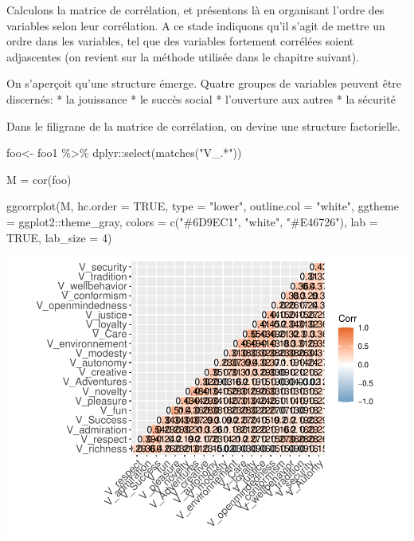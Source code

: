 \documentclass[
]{book}
\newenvironment{Shaded}{\begin{snugshade}}{\end{snugshade}}
\newcommand{\AttributeTok}[1]{\textcolor[rgb]{0.77,0.63,0.00}{#1}}
\newcommand{\ConstantTok}[1]{\textcolor[rgb]{0.00,0.00,0.00}{#1}}
\newcommand{\DecValTok}[1]{\textcolor[rgb]{0.00,0.00,0.81}{#1}}
\newcommand{\FunctionTok}[1]{\textcolor[rgb]{0.00,0.00,0.00}{#1}}
\newcommand{\NormalTok}[1]{#1}
\newcommand{\OtherTok}[1]{\textcolor[rgb]{0.56,0.35,0.01}{#1}}
\newcommand{\SpecialCharTok}[1]{\textcolor[rgb]{0.00,0.00,0.00}{#1}}
\newcommand{\StringTok}[1]{\textcolor[rgb]{0.31,0.60,0.02}{#1}}
\begin{document}
Calculons la matrice de corrélation, et présentons là en organisant l'ordre des variables selon leur corrélation. A ce stade indiquons qu'il s'agit de mettre un ordre dans les variables, tel que des variables fortement corrélées soient adjascentes (on revient sur la méthode utilisée dans le chapitre suivant).

On s'aperçoit qu'une structure émerge. Quatre groupes de variables peuvent être discernés:
* la jouissance
* le succès social
* l'ouverture aux autres
* la sécurité

Dans le filigrane de la matrice de corrélation, on devine une structure factorielle.

\begin{Shaded}
\begin{Highlighting}[]
\NormalTok{foo}\OtherTok{\textless{}{-}}\NormalTok{ foo1 }\SpecialCharTok{\%\textgreater{}\%} 
\NormalTok{  dplyr}\SpecialCharTok{::}\FunctionTok{select}\NormalTok{(}\FunctionTok{matches}\NormalTok{(}\StringTok{"V\_.*"}\NormalTok{))}

\NormalTok{M }\OtherTok{=} \FunctionTok{cor}\NormalTok{(foo)}

\FunctionTok{ggcorrplot}\NormalTok{(M, }\AttributeTok{hc.order =} \ConstantTok{TRUE}\NormalTok{, }\AttributeTok{type =} \StringTok{"lower"}\NormalTok{,}
   \AttributeTok{outline.col =} \StringTok{"white"}\NormalTok{,}
   \AttributeTok{ggtheme =}\NormalTok{ ggplot2}\SpecialCharTok{::}\NormalTok{theme\_gray,}
   \AttributeTok{colors =} \FunctionTok{c}\NormalTok{(}\StringTok{"\#6D9EC1"}\NormalTok{, }\StringTok{"white"}\NormalTok{, }\StringTok{"\#E46726"}\NormalTok{), }\AttributeTok{lab =} \ConstantTok{TRUE}\NormalTok{, }\AttributeTok{lab\_size =} \DecValTok{4}\NormalTok{)}
\end{Highlighting}
\end{Shaded}

\includegraphics{bookdown-demo_files/figure-latex/0603b-1.pdf}
\end{document}
